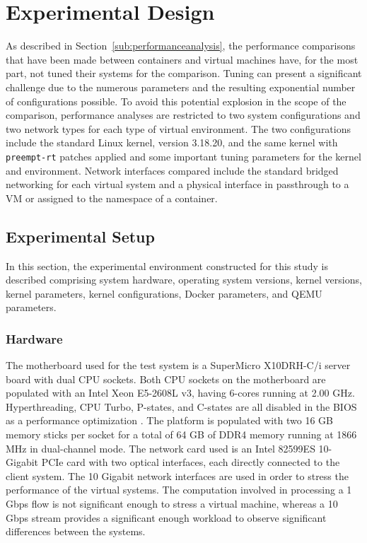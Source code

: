 \chapter{Experimental Design}
\label{sec:experimental_design}
As described in Section~\ref{sub:performanceanalysis}, the performance comparisons that have been made between containers and virtual machines have, for the most part, not tuned their systems for the comparison.
Tuning can present a significant challenge due to the numerous parameters and the resulting exponential number of configurations possible.  
To avoid this potential explosion in the scope of the comparison, performance analyses are restricted to two system configurations and two network types for each type of virtual environment.
The two configurations include the standard Linux kernel, version 3.18.20, and the same kernel with \texttt{preempt-rt} patches applied \autocite{preemptrtpatches} and some important tuning parameters for the kernel and environment.
Network interfaces compared include the standard bridged networking for each virtual system and a physical interface in passthrough to a VM or assigned to the namespace of a container.

\section{Experimental Setup} %
\label{sec:experimental_setup}
In this section, the experimental environment constructed for this study is described comprising system hardware, operating system versions, kernel versions, kernel parameters, kernel configurations, Docker parameters, and QEMU parameters.

\subsection{Hardware} %
\label{sec:hardware}
The motherboard used for the test system is a SuperMicro X10DRH-C/i server board with dual CPU sockets.
Both CPU sockets on the motherboard are populated with an Intel Xeon E5-2608L v3, having 6-cores running at 2.00 GHz.  
Hyperthreading, CPU Turbo, P-states, and C-states are all disabled in the BIOS as a performance optimization \autocite{preemptrtpatches}.  
The platform is populated with two 16 GB memory sticks per socket for a total of 64 GB of DDR4 memory running at 1866 MHz in dual-channel mode.  
The network card used is an Intel 82599ES 10-Gigabit PCIe card with two optical interfaces, each directly connected to the client system.  
The 10 Gigabit network interfaces are used in order to stress the performance of the virtual systems.  
The computation involved in processing a 1 Gbps flow is not significant enough to stress a virtual machine, whereas a 10 Gbps stream provides a significant enough workload to observe significant differences between the systems.

